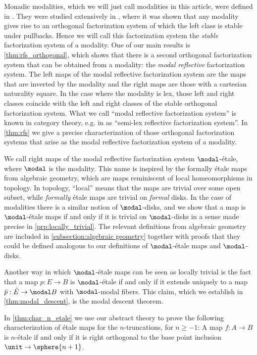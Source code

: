 \documentclass{msc}
\begin{document}
Monadic modalities, which we will just call modalities in this article, were defined in \cite[Section 7.7]{UFP}. They were studied extensively in \cite{RijkeSpittersShulman}, where it was shown that any modality gives rise to an orthogonal factorization system of which the left class is stable under pullbacks. Hence we will call this factorization system the \emph{stable} factorization system of a modality. One of our main results is \cref{thm:rfs_orthogonal}, which shows that there is a second orthogonal factorization system that can be obtained from a modality: the \emph{modal reflective} factorization system. The left maps of the modal reflective factorization system are the maps that are inverted by the modality and the right maps are those with a cartesian naturality square. In the case where the modality is lex, those left and right classes coincide with the left and right classes of the stable orthogonal factorization system. What we call ``modal reflective factorization system'' is known in category theory, e.g. in \cite{cassidy_hebert_kelly_1985} as ``semi-lex reflective factorization system''.
In \cref{thm:rfs} we give a precise characterization of those orthogonal factorization systems that arise as the modal reflective factorization system of a modality.

We call right maps of the modal reflective factorization system $\modal$-étale, where $\modal$ is the modality.
This name is inspired by the formally étale maps from algebraic geometry,
which are maps reminiscent of local homeomorphisms in topology.
In topology, ``local'' means that the maps are trivial over some open subset, while \emph{formally} étale maps are trivial on \emph{formal} disks.
In the case of modalities there is a similar notion of $\modal$-disks, and we show that a map is $\modal$-étale maps if and only if it is trivial on $\modal$-disks in a sense made precise in \cref{prp:locally_trivial}.
The relevant definitions from algebraic geometry are included in \cref{subsection:algebraic geometry}
together with proofs that they could be defined analogous to our definitions of $\modal$-étale maps and $\modal$-disks.

Another way in which $\modal$-\'etale maps can be seen as locally trivial is the fact that a map $p:E\to B$ is $\modal$-\'etale if and only if it extends uniquely to a map $\tilde{p}:\tilde{E}\to \modal B$ with $\modal$-modal fibers. This claim, which we establish in \cref{thm:modal_descent}, is the modal descent theorem. 

In \cref{thm:char_n_etale} we use our abstract theory to prove the following characterization of étale maps for the $n$-truncations, for $n\geq -1$:
A map $f:A\to B$ is $n$-\'etale if and only if it is right orthogonal to the base point inclusion $\unit\to\sphere{n+1}$.
\end{document}
